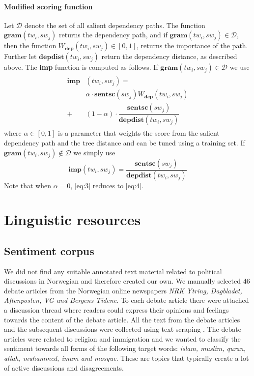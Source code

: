 \documentclass[11pt]{article}
\begin{document}
\paragraph{Modified scoring function}
Let $\mathcal{D}$ denote the set of all salient dependency paths. The function $\mathbf{gram}(tw_i, sw_{j})$ returns the dependency path, and if $\mathbf{gram}(tw_i, sw_{j}) \in \mathcal{D}$, then the function $W_{\mathbf{dep}}(tw_i, sw_{j}) \in [0,1]$, returns the importance of the path. Further let $\mathbf{depdist}(tw_i, sw_{j})$ return the dependency distance, as described above. The \textbf{imp} function is computed as follows. If $\mathbf{gram}(tw_i, sw_{j}) \in \mathcal{D}$ we use
\begin{align}
  \begin{split}
    \label{eq:3}
  \mathbf{imp}&(tw_i, sw_{j}) = \\
  &\alpha \cdot \mathbf{sentsc}(sw_{j}) W_{\mathbf{dep}}(tw_i, sw_{j}) \\
  +&(1 - \alpha) \cdot \dfrac{\mathbf{sentsc}(sw_{j})}{\mathbf{depdist}(tw_i, sw_{j})}    
  \end{split}
\end{align}
where $\alpha \in [0,1]$ is a parameter that weights the score from the salient dependency path and the tree distance and can be tuned using a training set. If $\mathbf{gram}(tw_i, sw_{j}) \not\in \mathcal{D}$ we simply use 
\begin{equation}
  \label{eq:4}
  \mathbf{imp}(tw_i, sw_{j}) = \dfrac{\mathbf{sentsc}(sw_{j})}{\mathbf{depdist}(tw_i, sw_{j})}    
\end{equation}
Note that when $\alpha = 0$, \eqref{eq:3} reduces to \eqref{eq:4}.


\section{Linguistic resources}
\label{sec:results}

\subsection{Sentiment corpus}

We did not find any suitable annotated text material related to political discussions in Norwegian and therefore created our own. We manually selected 46 debate articles from the Norwegian online newspapers \textit{NRK Ytring, Dagbladet, Aftenposten, VG and Bergens Tidene}. To each debate article there were attached a discussion thread where readers could express their opinions and feelings towards the content of the debate article. All the text from the debate articles and the subsequent discussions were collected using text scraping \cite{Hammer13}. The debate articles were related to religion and immigration and we wanted to classify the sentiment towards all forms of the following target words: \textit{islam, muslim, quran, allah, muhammed, imam and mosque}. These are topics that typically create a lot of active discussions and disagreements.
\end{document}
